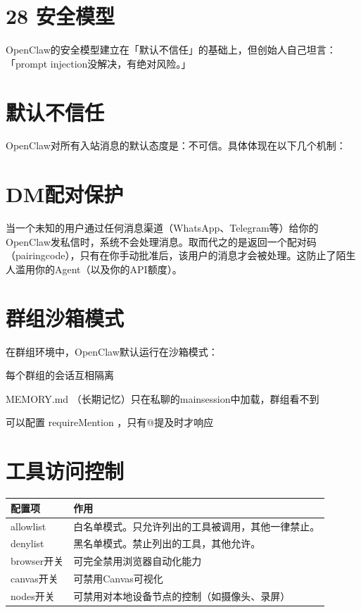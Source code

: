 \documentclass[
  10
]{article}
\newcounter{none} %
\begin{document}
\section{28 安全模型}\label{ux5b89ux5168ux6a21ux578b}

OpenClaw的安全模型建立在「默认不信任」的基础上，但创始人自己坦言：「prompt
injection没解决，有绝对风险。」

\section{默认不信任}\label{ux9ed8ux8ba4ux4e0dux4fe1ux4efb}

OpenClaw对所有入站消息的默认态度是：不可信。具体体现在以下几个机制：

\section{DM配对保护}\label{dmux914dux5bf9ux4fddux62a4}

当一个未知的用户通过任何消息渠道（WhatsApp、Telegram等）给你的OpenClaw发私信时，系统不会处理消息。取而代之的是返回一个配对码（pairingcode），只有在你手动批准后，该用户的消息才会被处理。这防止了陌生人滥用你的Agent（以及你的API额度）。

\section{群组沙箱模式}\label{ux7fa4ux7ec4ux6c99ux7bb1ux6a21ux5f0f}

在群组环境中，OpenClaw默认运行在沙箱模式：

每个群组的会话互相隔离

MEMORY.md （长期记忆）只在私聊的mainsession中加载，群组看不到

可以配置 requireMention ，只有@提及时才响应

\section{工具访问控制}\label{ux5de5ux5177ux8bbfux95eeux63a7ux5236}

{\def\LTcaptype{none} %
\begin{longtable}[]{@{}|l|l|@{}}
\toprule\noalign{}
\endhead
\bottomrule\noalign{}
\endlastfoot
\hline
配置项 & 作用 \\
\hline
allowlist & 白名单模式。只允许列出的工具被调用，其他一律禁止。 \\
\hline
denylist & 黑名单模式。禁止列出的工具，其他允许。 \\
\hline
browser开关 & 可完全禁用浏览器自动化能力 \\
\hline
canvas开关 & 可禁用Canvas可视化 \\
\hline
nodes开关 & 可禁用对本地设备节点的控制（如摄像头、录屏） \\
\hline
\end{longtable}
}
\end{document}
